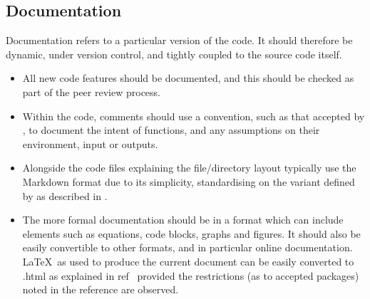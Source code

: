 
\subsection{Documentation} \label{sec:doc}

Documentation refers to a particular version of the code. It should therefore be
dynamic, under version control, and tightly coupled to the source code itself. 

\begin{itemize}
\item All new code features should be documented, and this should be checked as
part of the peer review process.
\item Within the code, comments should use a convention, such as that
accepted by ,
to document the intent of functions, and any assumptions on their
environment, input or outputs.
\item Alongside the code  files explaining the file/directory layout 
typically use the Markdown format due to its simplicity,
standardising on the variant defined by  as described in \cite{y2d34}.
\item The more formal documentation should be in a format which can
include elements such as equations, code blocks, graphs and figures.
It should also be easily convertible to other formats, and in
particular online documentation. \LaTeX \ as used to produce the current document
can be easily converted to .html as explained in ref~\cite{y2d34} provided
the restrictions (as to accepted packages) noted in the reference are observed.
\end{itemize}


